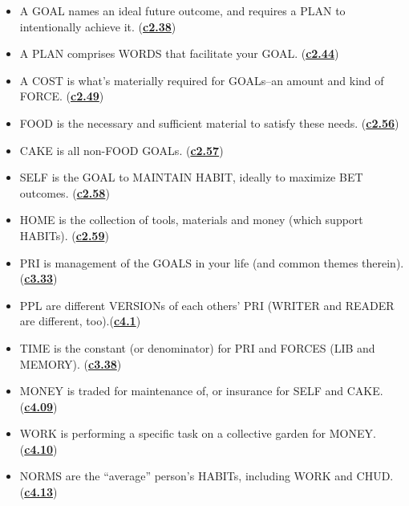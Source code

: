 \documentclass[
]{book}
\providecommand{\tightlist}{%
  \setlength{\itemsep}{0pt}\setlength{\parskip}{0pt}}
\begin{document}
\begin{itemize}
\tightlist
\item
  A GOAL names an ideal future outcome, and requires a PLAN to intentionally achieve it. (\protect\hyperlink{core-concepts}{\textbf{c2.38}})\\
\item
  A PLAN comprises WORDS that facilitate your GOAL. (\protect\hyperlink{core-concepts}{\textbf{c2.44}})\\
\item
  A COST is what's materially required for GOALs--an amount and kind of FORCE. (\protect\hyperlink{core-concepts}{\textbf{c2.49}})\\
\item
  FOOD is the necessary and sufficient material to satisfy these needs. (\protect\hyperlink{self-1}{\textbf{c2.56}})\\
\item
  CAKE is all non-FOOD GOALs. (\protect\hyperlink{self-1}{\textbf{c2.57}})\\
\item
  SELF is the GOAL to MAINTAIN HABIT, ideally to maximize BET outcomes. (\protect\hyperlink{self-1}{\textbf{c2.58}})\\
\item
  HOME is the collection of tools, materials and money (which support HABITs). (\protect\hyperlink{home}{\textbf{c2.59}})\\
\item
  PRI is management of the GOALS in your life (and common themes therein). (\protect\hyperlink{attention-and-time}{\textbf{c3.33}})\\
\item
  PPL are different VERSIONs of each others' PRI (WRITER and READER are different, too).(\protect\hyperlink{ppl}{\textbf{c4.1}})\\
\item
  TIME is the constant (or denominator) for PRI and FORCES (LIB and MEMORY). (\protect\hyperlink{attention-and-time}{\textbf{c3.38}})\\
\item
  MONEY is traded for maintenance of, or insurance for SELF and CAKE. (\protect\hyperlink{ppl}{\textbf{c4.09}})\\
\item
  WORK is performing a specific task on a collective garden for MONEY. (\protect\hyperlink{work}{\textbf{c4.10}})\\
\item
  NORMS are the ``average'' person's HABITs, including WORK and CHUD. (\protect\hyperlink{work}{\textbf{c4.13}})\\

\end{itemize}
\end{document}
